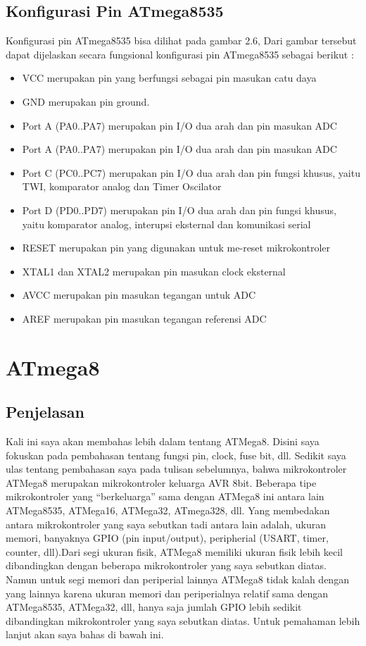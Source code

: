 		\subsection{Konfigurasi Pin ATmega8535}
		Konfigurasi pin ATmega8535 bisa dilihat pada gambar 2.6, Dari gambar tersebut dapat dijelaskan secara fungsional konfigurasi pin ATmega8535 sebagai berikut :
		\begin{itemize}
			\item VCC merupakan pin yang berfungsi sebagai pin masukan catu daya
			\item GND merupakan pin ground.
			\item Port A (PA0..PA7) merupakan pin I/O dua arah dan pin masukan ADC
			\item Port A (PA0..PA7) merupakan pin I/O dua arah dan pin masukan ADC
			\item Port C (PC0..PC7) merupakan pin I/O dua arah dan pin fungsi khusus, yaitu TWI, komparator analog dan Timer Oscilator
			\item Port D (PD0..PD7) merupakan pin I/O dua arah dan pin fungsi khusus, yaitu komparator analog, interupsi eksternal dan komunikasi serial
			\item RESET merupakan pin yang digunakan untuk me-reset mikrokontroler
			\item XTAL1 dan XTAL2 merupakan pin masukan clock eksternal
			\item AVCC merupakan pin masukan tegangan untuk ADC
			\item AREF merupakan pin masukan tegangan referensi ADC
		\end{itemize}

\section{ATmega8}

	\subsection{Penjelasan}
		Kali ini saya akan membahas lebih dalam tentang ATMega8. Disini saya fokuskan pada pembahasan tentang fungsi pin, clock, fuse bit, dll.
		Sedikit saya ulas tentang pembahasan saya pada tulisan sebelumnya, bahwa mikrokontroler ATMega8 merupakan mikrokontroler keluarga AVR 8bit. Beberapa tipe mikrokontroler yang “berkeluarga” sama dengan ATMega8 ini antara lain ATMega8535, ATMega16, ATMega32, ATmega328, dll. Yang membedakan antara mikrokontroler yang saya sebutkan tadi antara lain adalah, ukuran memori, banyaknya GPIO (pin input/output), peripherial (USART, timer, counter, dll).Dari segi ukuran fisik, ATMega8 memiliki ukuran fisik lebih kecil dibandingkan dengan beberapa mikrokontroler yang saya sebutkan diatas. Namun untuk segi memori dan periperial lainnya ATMega8 tidak kalah dengan yang lainnya karena ukuran memori dan periperialnya relatif sama dengan ATMega8535, ATMega32, dll, hanya saja jumlah GPIO lebih sedikit dibandingkan mikrokontroler yang saya sebutkan diatas. Untuk pemahaman lebih lanjut akan saya bahas di bawah ini.
	
